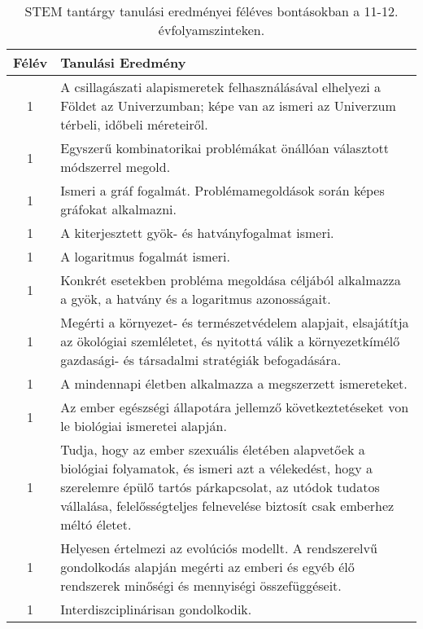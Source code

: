 \begin{longtable}{c | p{12cm} }
                        \end{longtable}
            \clearpage

       
           \begin{longtable}{c | p{12cm} }
            \caption[STEM 11-12.]{STEM tantárgy tanulási eredményei féléves bontásokban a 11-12. évfolyamszinteken. }  \\

            \textbf{Félév} & \textbf{Tanulási Eredmény} \\
            \hline
            \endhead
                                
                                      
                                
                                          1 &  A csillagászati alapismeretek felhasználásával elhelyezi a Földet az Univerzumban; képe van az ismeri az Univerzum térbeli, időbeli méreteiről. \\ \hline
                                          1 &  Egyszerű kombinatorikai problémákat önállóan választott módszerrel megold. \\ \hline
                                          1 &  Ismeri a gráf fogalmát. Problémamegoldások során képes gráfokat alkalmazni. \\ \hline
                                          1 &  A kiterjesztett gyök- és hatványfogalmat ismeri. \\ \hline
                                          1 &  A logaritmus fogalmát ismeri. \\ \hline
                                          1 &  Konkrét esetekben probléma megoldása céljából  alkalmazza a gyök, a hatvány és a logaritmus azonosságait. \\ \hline
                                          1 &  Megérti a környezet- és természetvédelem alapjait, elsajátítja az ökológiai szemléletet, és nyitottá válik a környezetkímélő gazdasági- és társadalmi stratégiák befogadására. \\ \hline
                                          1 &  A mindennapi életben alkalmazza a megszerzett ismereteket. \\ \hline
                                          1 &  Az ember egészségi állapotára jellemző következtetéseket von le biológiai ismeretei alapján. \\ \hline
                                          1 &  Tudja, hogy az ember szexuális életében alapvetőek a biológiai folyamatok, és ismeri azt a vélekedést, hogy a szerelemre épülő tartós párkapcsolat, az utódok tudatos vállalása, felelősségteljes felnevelése biztosít csak emberhez méltó életet. \\ \hline
                                          1 &  Helyesen értelmezi az evolúciós modellt. A rendszerelvű gondolkodás alapján megérti az emberi és egyéb élő rendszerek minőségi és mennyiségi összefüggéseit. \\ \hline
                                          1 &  Interdiszciplinárisan gondolkodik. \\ \hline
                                      

\end{longtable}

